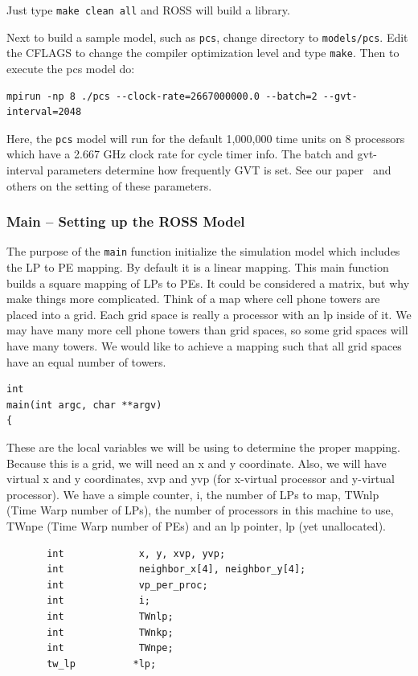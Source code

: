 \documentclass[12pt]{article}
\begin{document}
Just type {\tt make clean all} and ROSS will build a library.

Next to build a sample model, such as {\tt pcs}, change directory
to {\tt models/pcs}. Edit the CFLAGS to change the compiler optimization
level and type {\tt make}. Then to execute the pcs model do:

\begin{verbatim}
mpirun -np 8 ./pcs --clock-rate=2667000000.0 --batch=2 --gvt-interval=2048
\end{verbatim}

Here, the {\tt pcs} model will run for the default 1,000,000 time units on 8
processors which have a 2.667 GHz clock rate for cycle timer info.  The batch
and gvt-interval parameters determine how frequently GVT is set. See our
paper~\cite{carothers-jpdc-2002} and others on the setting of these
parameters.

\subsubsection{Main -- Setting up the ROSS Model}
The purpose of the {\tt main} function initialize the simulation model which
includes the LP to PE mapping. By default it is a linear mapping.  This main
function builds a square mapping of LPs to PEs.  It could be considered a
matrix, but why make things more complicated.  Think of a map where cell phone
towers are placed into a grid.  Each grid space is really a processor with an
lp inside of it.  We may have many more cell phone towers than grid spaces, so
some grid spaces will have many towers.  We would like to achieve a mapping
such that all grid spaces have an equal number of towers.

\begin{verbatim}
int
main(int argc, char **argv)
{
\end{verbatim}

These are the local variables we will be using to determine the proper
mapping.  Because this is a grid, we will need an x and y coordinate.  Also,
we will have virtual x and y coordinates, xvp and yvp (for x-virtual processor
and y-virtual processor).  We have a simple counter, i, the number of LPs to
map, TWnlp (Time Warp number of LPs), the number of processors in this machine
to use, TWnpe (Time Warp number of PEs) and an lp pointer, lp (yet
unallocated).
 
\begin{verbatim}
       int             x, y, xvp, yvp;
       int             neighbor_x[4], neighbor_y[4];
       int             vp_per_proc;
       int             i;
       int             TWnlp;
       int             TWnkp;
       int             TWnpe;
       tw_lp          *lp;
\end{verbatim}
 
\end{document}
